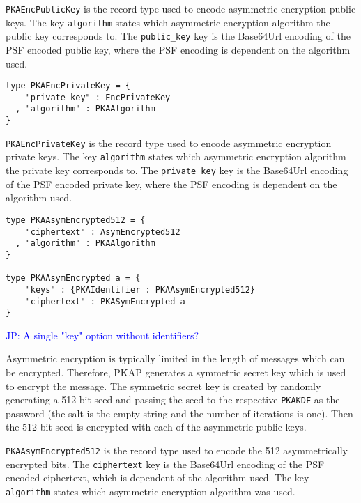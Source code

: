 \documentclass{article}
\newcommand{\pkap}{PKAP}
\newcommand{\jp}[1]{\textcolor{blue}{JP: #1}}
\begin{document}
\texttt{PKAEncPublicKey} is the record type used to encode asymmetric encryption public keys. 
The key \texttt{algorithm} states which asymmetric encryption algorithm the public key corresponds to. 
The \texttt{public\_key} key is the Base64Url encoding of the PSF encoded public key, where the PSF encoding is dependent on the algorithm used. 

\begin{lstlisting}
type PKAEncPrivateKey = {
    "private_key" : EncPrivateKey
  , "algorithm" : PKAAlgorithm
}
\end{lstlisting}

\texttt{PKAEncPrivateKey} is the record type used to encode asymmetric encryption private keys. 
The key \texttt{algorithm} states which asymmetric encryption algorithm the private key corresponds to. 
The \texttt{private\_key} key is the Base64Url encoding of the PSF encoded private key, where the PSF encoding is dependent on the algorithm used. 

%
%
\begin{lstlisting}
type PKAAsymEncrypted512 = {
    "ciphertext" : AsymEncrypted512
  , "algorithm" : PKAAlgorithm
}

type PKAAsymEncrypted a = {
    "keys" : {PKAIdentifier : PKAAsymEncrypted512}
    "ciphertext" : PKASymEncrypted a
}
\end{lstlisting}

\jp{A single "key" option without identifiers?}


Asymmetric encryption is typically limited in the length of messages which can be encrypted. 
Therefore, \pkap{} generates a symmetric secret key which is used to encrypt the message. 
The symmetric secret key is created by randomly generating a 512 bit seed and passing the seed to the respective \texttt{PKAKDF} as the password (the salt is the empty string and the number of iterations is one). 
Then the 512 bit seed is encrypted with each of the asymmetric public keys. 

\texttt{PKAAsymEncrypted512} is the record type used to encode the 512 asymmetrically encrypted bits. 
The \texttt{ciphertext} key is the Base64Url encoding of the PSF encoded ciphertext, which is dependent of the algorithm used. 
The key \texttt{algorithm} states which asymmetric encryption algorithm was used. 
\end{document}
